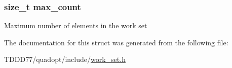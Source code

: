 \subsubsection[{max\+\_\+count}]{\setlength{\rightskip}{0pt plus 5cm}size\+\_\+t max\+\_\+count}\label{structwork__set_acc1d5d6a690bac67f3439e3265a05694}
Maximum number of elements in the work set 

The documentation for this struct was generated from the following file\+:\begin{DoxyCompactItemize}
\item 
T\+D\+D\+D77/quadopt/include/\hyperlink{work__set_8h}{work\+\_\+set.\+h}\end{DoxyCompactItemize}
